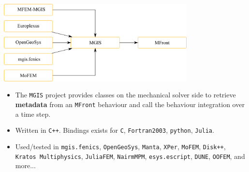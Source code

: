 \documentclass{beamer}
\begin{document}
\begin{frame}
  \begin{center}
    \includegraphics[width=0.75\textwidth]{img/mgis.pdf}
  \end{center}
  \begin{itemize}
    \item The {\tt MGIS} project provides classes on the mechanical solver
    side to retrieve {\bf metadata} from an {\tt MFront} behaviour and
    call the behaviour integration over a time step.
    \item Written in \texttt{C++}. Bindings exists for
    \texttt{C}, \texttt{Fortran2003}, \texttt{python}, \texttt{Julia}.
    \item Used/tested in \texttt{mgis.fenics},
    \texttt{OpenGeoSys}, \texttt{Manta}, \texttt{XPer}, \texttt{MoFEM},
    \texttt{Disk++}, \texttt{Kratos Multiphysics}, \texttt{JuliaFEM},
    \texttt{NairmMPM}, \texttt{esys.escript}, \texttt{DUNE},
    \texttt{OOFEM}, and more...
  \end{itemize}
\end{frame}
\end{document}
